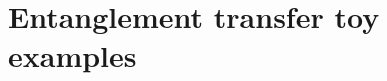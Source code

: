 \documentclass[
	aps, pra,
	superscriptaddress, twocolumn,
	floatfix,
	10pt
]{revtex4-1}
\newcommand{\parTitle}[1]{\noindent{\color{Mahogany}(\emph{#1})}}
\newcommand{\calH}{{\mathcal{H}}}
\newcommand{\calS}{{\mathcal{S}}}
\renewcommand{\parTitle}[1]{}
\begin{document}

\section{Entanglement transfer toy examples}
\end{document}

